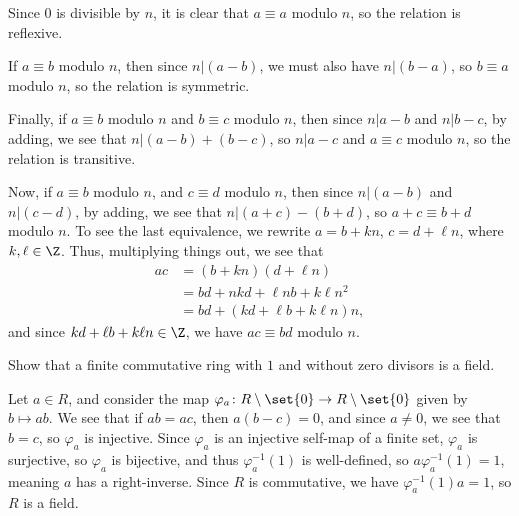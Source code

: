 \documentclass[10pt]{mypackage}
\begin{document}
\begin{solution}
  Since $0$ is divisible by $n$, it is clear that $a\equiv a$ modulo $n$, so the relation is reflexive.\newline

  If $a\equiv b$ modulo $n$, then since $n | \left( a-b \right)$, we must also have $n | \left( b-a \right)$, so $b\equiv a$ modulo $n$, so the relation is symmetric.\newline

  Finally, if $a\equiv b$ modulo $n$ and $b\equiv c$ modulo $n$, then since $n | a-b$ and $n | b-c$, by adding, we see that $n | \left( a-b \right) + \left( b- c\right)$, so $n | a-c$ and $a\equiv c$ modulo $n$, so the relation is transitive.\newline

  Now, if $a\equiv b$ modulo $n$, and $c\equiv d$ modulo $n$, then since $n | \left( a-b \right)$ and $n | \left( c-d \right)$, by adding, we see that $n | \left( a+c \right)-\left( b+d \right)$, so $a+c\equiv b+d$ modulo $n$. To see the last equivalence, we rewrite $a = b + kn$, $c = d + \ell n$, where $k,\ell\in \Z$. Thus, multiplying things out, we see that
  \begin{align*}
    ac &= \left( b+kn \right)\left( d + \ell n \right)\\
       &= bd + nkd + \ell n b + k\ell n^2\\
       &= bd + \left( kd + \ell b + k\ell n \right) n,
  \end{align*}
  and since $kd + \ell b + k\ell n\in \Z$, we have $ac \equiv bd$ modulo $n$.
\end{solution}
\begin{problem}[Problem 4]
  Show that a finite commutative ring with $1$ and without zero divisors is a field.
\end{problem}
\begin{solution}
  Let $a\in R$, and consider the map $\varphi_{a}\colon R\setminus \set{0} \rightarrow R\setminus \set{0}$ given by $b\mapsto ab$. We see that if $ab = ac$, then $a\left( b-c \right) = 0$, and since $a\neq 0$, we see that $b = c$, so $\varphi_{a}$ is injective. Since $\varphi_a$ is an injective self-map of a finite set, $\varphi_a$ is surjective, so $\varphi_{a}$ is bijective, and thus $\varphi_a^{-1}\left( 1 \right)$ is well-defined, so $a\varphi_{a}^{-1}\left( 1 \right) = 1$, meaning $a$ has a right-inverse. Since $R$ is commutative, we have $\varphi_{a}^{-1}\left( 1 \right)a = 1$, so $R$ is a field.
\end{solution}
\end{document}

